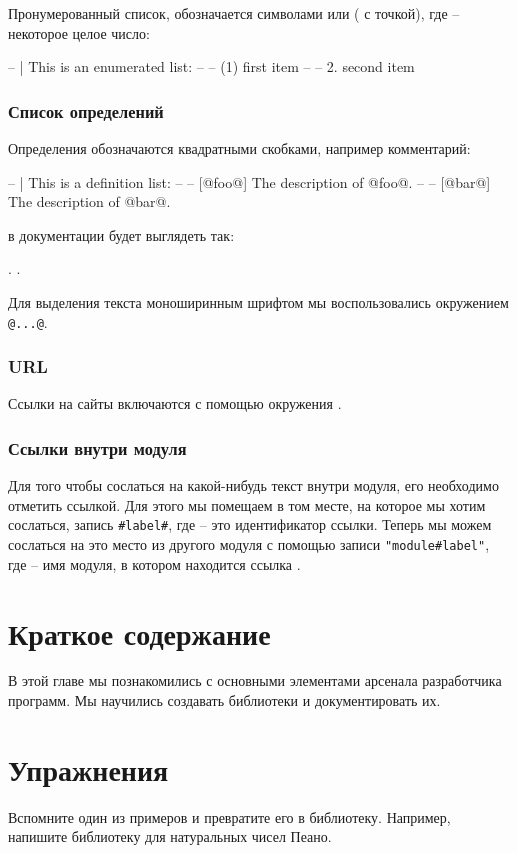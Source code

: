 Пронумерованный список, обозначается символами  или 
( с точкой),
где  -- некоторое целое число:

\begin{code}
-- | This is an enumerated list:
--
--     (1) first item
--
--     2. second item
\end{code}

\subsubsection{Список определений}

Определения обозначаются квадратными скобками,
например комментарий:

\begin{code}
-- | This is a definition list:
--
--   [@foo@] The description of @foo@.
--
--   [@bar@] The description of @bar@.
\end{code}

\noindent в документации будет выглядеть так:

.
.

\smallskip

Для выделения текста моноширинным шрифтом мы воспользовались
окружением \verb!@...@!.

\subsubsection{URL}

Ссылки на сайты включаются с помощью окружения .

\subsubsection{Ссылки внутри модуля}

Для того чтобы сослаться на какой-нибудь текст внутри
модуля, его необходимо отметить ссылкой. Для этого 
мы помещаем в том месте, на которое мы хотим сослаться,
запись \texttt{\#label\#}, где  -- это идентификатор 
ссылки. Теперь мы можем сослаться на это место из другого
модуля с помощью записи \texttt{"module\#label"}, где 
-- имя модуля, в котором находится ссылка .

\section{Краткое содержание}

В этой главе мы познакомились с основными элементами
арсенала разработчика программ. Мы научились создавать 
библиотеки и документировать их.

\section{Упражнения}

Вспомните один из примеров и превратите его в библиотеку.
Например, напишите библиотеку для натуральных чисел Пеано.
